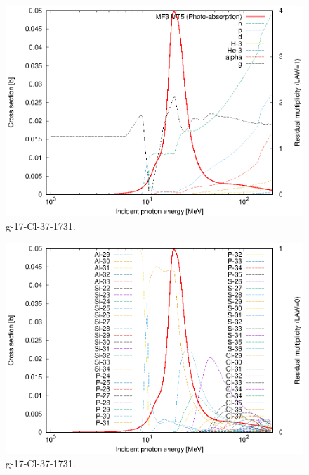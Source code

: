 \begin{figure}
 \includegraphics[width=\linewidth]{eps/g_17-Cl-37_1731.eps}
  \caption{g-17-Cl-37-1731.}
\end{figure}
\begin{figure}
 \includegraphics[width=\linewidth]{eps-law0/g_17-Cl-37_1731.eps}
 \caption{g-17-Cl-37-1731.}
\end{figure}
\newpage \clearpage

